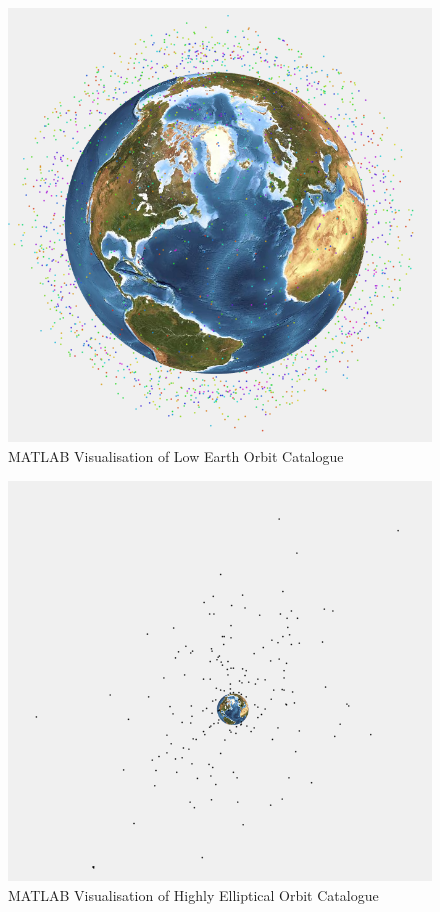 \documentclass[12pt,openany,a4paper]{book}
\begin{document}
			\begin{figure}[H]
				\centering
				\caption{MATLAB Visualisation of Low Earth Orbit Catalogue}
				\label{LEO}
				\includegraphics[scale=0.6]{LEO.png}
			\end{figure}

			\begin{figure}[H]
				\centering
				\caption{MATLAB Visualisation of Highly Elliptical Orbit Catalogue}
				\label{HEO}
				\includegraphics[scale=0.6]{HEO.png}
			\end{figure}
			
\end{document}
